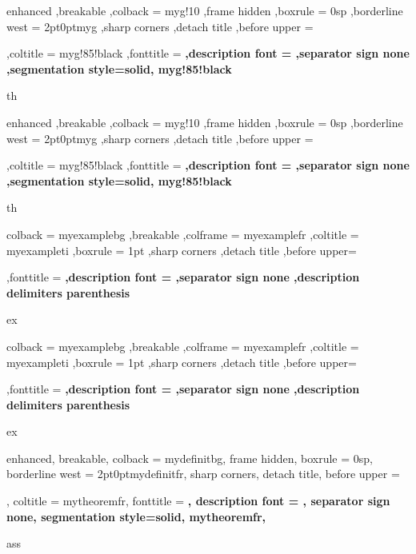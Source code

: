
{%
	enhanced
	,breakable
	,colback = myg!10
	,frame hidden
	,boxrule = 0sp
	,borderline west = {2pt}{0pt}{myg}
	,sharp corners
	,detach title
	,before upper = \tcbtitle\par\smallskip
	,coltitle = myg!85!black
	,fonttitle = \bfseries\sffamily
	,description font = \mdseries
	,separator sign none
	,segmentation style={solid, myg!85!black}
}
{th}


{%
	enhanced
	,breakable
	,colback = myg!10
	,frame hidden
	,boxrule = 0sp
	,borderline west = {2pt}{0pt}{myg}
	,sharp corners
	,detach title
	,before upper = \tcbtitle\par\smallskip
	,coltitle = myg!85!black
	,fonttitle = \bfseries\sffamily
	,description font = \mdseries
	,separator sign none
	,segmentation style={solid, myg!85!black}
}
{th}


{%
	colback = myexamplebg
	,breakable
	,colframe = myexamplefr
	,coltitle = myexampleti
	,boxrule = 1pt
	,sharp corners
	,detach title
	,before upper=\tcbtitle\par\smallskip
	,fonttitle = \bfseries
	,description font = \mdseries
	,separator sign none
	,description delimiters parenthesis
}
{ex}

{%
	colback = myexamplebg
	,breakable
	,colframe = myexamplefr
	,coltitle = myexampleti
	,boxrule = 1pt
	,sharp corners
	,detach title
	,before upper=\tcbtitle\par\smallskip
	,fonttitle = \bfseries
	,description font = \mdseries
	,separator sign none
	,description delimiters parenthesis
}
{ex}


{%
	enhanced,
	breakable,
	colback = mydefinitbg,
	frame hidden,
	boxrule = 0sp,
	borderline west = {2pt}{0pt}{mydefinitfr},
	sharp corners,
	detach title,
	before upper = \tcbtitle\par\smallskip,
	coltitle = mytheoremfr,
	fonttitle = \bfseries\sffamily,
	description font = \mdseries,
	separator sign none,
	segmentation style={solid, mytheoremfr},
}
{ass}


